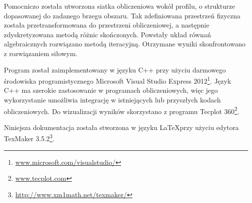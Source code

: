 \indent Pomocniczo została utworzona siatka obliczeniowa wokół profilu, o strukturze dopasowanej do zadanego brzegu obszaru. Tak zdefiniowana przestrzeń fizyczna została przetransformowana do przestrzeni obliczeniowej, a następnie zdyskretyzowana metodą różnic skończonych. Powstały układ równań algebraicznych rozwiązano metodą iteracyjną. Otrzymane wyniki skonfrontowano z rozwiązaniem siłowym.

\indent Program został zaimplementowany w języku C++ przy użyciu darmowego środowiska programistycznego Microsoft Visual Studio Express 2012\footnote{\url{www.microsoft.com/visualstudio/}}. Język C++ ma szerokie zastosowanie w programach obliczeniowych, więc jego wykorzystanie umożliwia integrację w istniejących lub przyszłych kodach obliczeniowych. Do wizualizacji wyników skorzystano z programu \textsf{Tecplot 360}\footnote{\url{www.tecplot.com}}.

\indent Niniejsza dokumentacja została stworzona w języku \LaTeX\quad przy użyciu edytora \textsf{TexMaker 3.5.2}\footnote{\url{http://www.xm1math.net/texmaker/}}.